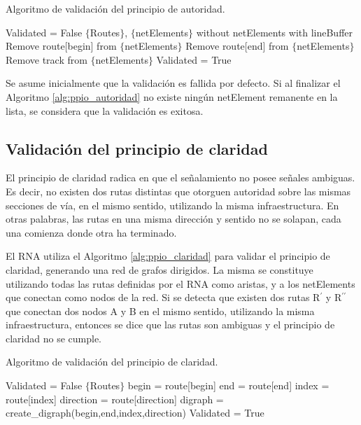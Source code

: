 		\begin{algorithm}[hbt!]
			\caption{Algoritmo de validación del principio de autoridad.}\label{alg:ppio_autoridad}
			\DontPrintSemicolon
			\SetNoFillComment
			\LinesNotNumbered 
			Validated = False\;
			$\{$Routes$\}$, $\{$netElements$\}$ without netElements with lineBuffer\; 
			{
				{
					Remove route[begin] from $\{$netElements$\}$\; 
				}
				{
					Remove route[end] from $\{$netElements$\}$\; 
				}
				{
					{
						Remove track from $\{$netElements$\}$\; 
					} 
				}
			}
			{
				Validated = True\; 
			} 
		\end{algorithm}
		
		Se asume inicialmente que la validación es fallida por defecto. Si al finalizar el Algoritmo \ref{alg:ppio_autoridad} no existe ningún netElement remanente en la lista, se considera que la validación es exitosa.	
			
	\subsection{Validación del principio de claridad}
		
		El principio de claridad radica en que el señalamiento no posee señales ambiguas. Es decir, no existen dos rutas distintas que otorguen autoridad sobre las mismas secciones de vía, en el mismo sentido, utilizando la misma infraestructura. En otras palabras, las rutas en una misma dirección y sentido no se solapan, cada una comienza donde otra ha terminado.
		
		El RNA utiliza el Algoritmo \ref{alg:ppio_claridad} para validar el principio de claridad, generando una red de grafos dirigidos. La misma se constituye utilizando todas las rutas definidas por el RNA como aristas, y a los netElements que conectan como nodos de la red. Si se detecta que existen dos rutas R$^{\prime}$ y R$^{\prime\prime}$ que conectan dos nodos A y B en el mismo sentido, utilizando la misma infraestructura, entonces se dice que las rutas son ambiguas y el principio de claridad no se cumple.
		
		\begin{algorithm}[hbt!]
			\caption{Algoritmo de validación del principio de claridad.}\label{alg:ppio_claridad}
			\DontPrintSemicolon
			\SetNoFillComment
			\LinesNotNumbered 
			Validated = False\;
			$\{$Routes$\}$\; 
			{
				begin = route[begin]\;
				end = route[end]\;
				index = route[index] \;
				direction = route[direction]\;
				digraph = create\_digraph(begin,end,index,direction)\;	
			}
			{
				Validated = True\;
			}
		\end{algorithm}
		
